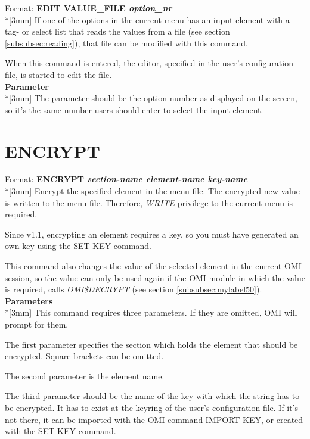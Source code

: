 \documentclass[a4paper]{book}
\newcommand{\vs}{\vspace{3mm}}
\renewcommand{\indent}{\hspace*{5mm}}
\begin{document}
\indent Format: \textbf{EDIT VALUE{\_}FILE \textit{option{\_}nr}}\\*[3mm]
If one of the options in the current menu has an input element with a tag- 
or select list that reads the values from a file (see section 
\ref{subsubsec:reading}), that file can be modified with this command.

When this command is entered, the editor, specified in the user's 
configuration file, is started to edit the file.\\[3mm]
\textbf{Parameter}\\*[3mm]
The parameter should be the option number as displayed on the screen, so 
it's the same number users should enter to select the input element.


\section{ENCRYPT}
\label{subsec:encrypt}

\indent Format: \textbf{ENCRYPT \textit{section-name element-name key-name}}\dag\\*[3mm]
Encrypt the specified element in the menu file. The encrypted new value is 
written to the menu file. Therefore, \textsl{WRITE} privilege to the current menu is 
required.

Since v1.1, encrypting an element requires a key, so you must have generated 
an own key using the \textsf{SET KEY} command.

\vs

This command also changes the value of the selected element in the current 
OMI session, so the value can only be used again if the OMI module in which 
the value is required, calls \textsl{OMI{\$}DECRYPT} (see section \ref{subsubsec:mylabel50}).\\[3mm]
\textbf{Parameters}\\*[3mm]
This command requires three parameters. If they are omitted, OMI will prompt 
for them.

\vs

The first parameter specifies the section which holds the element that 
should be encrypted. Square brackets can be omitted.

The second parameter is the element name.

The third parameter should be the name of the key with which the string has 
to be encrypted. It has to exist at the keyring of the user's configuration 
file. If it's not there, it can be imported with the OMI command \textsf{IMPORT KEY}, 
or created with the \textsf{SET KEY} command.
\end{document}
